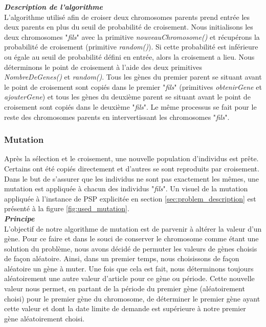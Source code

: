 		\vspace*{.3cm}
	    \textbf{\textsl{Description de l'algorithme}}\\
		\hspace*{.5cm} L'algorithme utilisé afin de croiser deux chromosomes parents prend entrée les deux parents en plus du seuil de probabilité de croisement. Nous initialisons les deux chromosomes "\emph{fils}" avec la primitive \emph{nouveauChromosome()} et récupérons la probabilité de croisement (primitive \emph{random()}). Si cette probabilité est inférieure ou égale au seuil de probabilité défini en entrée, alors la croisement a lieu. Nous déterminons le point de croisement à l'aide des deux primitives \emph{NombreDeGenes()} et \emph{random()}. Tous les gènes du premier parent se situant avant le point de croisement sont copiés dans le premier "\emph{fils}" (primitives \emph{obtenirGene} et \emph{ajouterGene}) et tous les gènes du deuxième parent se situant avant le point de croisement sont copiés dans le deuxième "\emph{fils}". Le même processus se fait pour le reste des chromosomes parents en intervertissant les chromosomes "\emph{fils}".
		
		  
	\subsubsection{Mutation}
	Après la sélection et le croisement, une nouvelle population d'individus est prête. Certains ont été copiés directement et d'autres se sont reproduits par croisement. Dans le but de s'assurer que les individus ne sont pas exactement les mêmes, une mutation est appliquée à chacun des individus "\emph{fils}". Un visuel de la mutation appliquée à l'instance de PSP explicitée en section \ref{sec:problem_description} est présenté à la figure \ref{fig:used_mutation}.\\
	
	\hspace*{.5cm} \textbf{\textsl{Principe}}\\
	\hspace*{.5cm} L'objectif de notre algorithme de mutation est de parvenir à altérer la valeur d'un gène. Pour ce faire et dans le souci de conserver le chromosome comme étant une solution du problème, nous avons décidé de permuter les valeurs de gènes choisis de façon aléatoire. Ainsi, dans un premier temps, nous choisissons de façon aléatoire un gène à muter. Une fois que cela est fait, nous déterminons toujours aléatoirement une autre valeur d'article pour ce gène ou période. Cette nouvelle valeur nous permet, en partant de la période du premier gène (aléatoirement choisi) pour le premier gène du chromosome, de déterminer le premier gène ayant cette valeur et dont la date limite de demande est supérieure à notre premier gène aléatoirement choisi.
	
